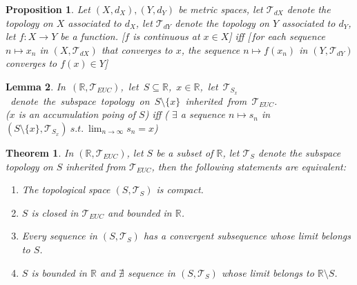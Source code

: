 \documentclass[11pt]{article}
\theoremstyle{break}
\theoremstyle{break}
\newtheorem{thm}{Theorem}[section]
\newtheorem{lem}{Lemma}[thm]
\newtheorem{prop}[lem]{Proposition}
\newcommand{\R}{\mathbb{R}}
\newcommand{\T}{\mathcal{T}}
\begin{document}
	\begin{prop}
		Let $(X,d_X),(Y,d_Y)$ be metric spaces, let $\T_{dX}$ denote the topology on $X$ associated to $d_X$, let $\T_{dY}$ denote the topology on $Y$ associated to $d_Y$, let $f:X \to Y$ be a function. [$f$ is continuous at $x \in X$] iff [\,for each sequence $n \mapsto x_n$ in $(X,\T_{dX})$ that converges to $x$, the sequence $n \mapsto f(x_n)$ in $(Y,\T_{dY})$ converges to $f(x) \in Y$]
	\end{prop}
	
	\begin{lem}
		\mbox{In $(\R, \T_{EUC})$, let $S \subseteq \R$, $x \in \R$, let $\T_{S_x}$ denote the subspace topology on $S \setminus \{x \} $ inherited from $\T_{EUC}$.}\\($x$ is an accumulation poing of $S$) iff ( $\exists$ a sequence $n \mapsto s_n$ in $(S\setminus \{x \},\T_{S_x}) \ s.t. \ \lim_{n \to \infty} s_n = x$)
	\end{lem} 
	
	
	\begin{thm}
		In $(\R, \T_{EUC})$, let $S$ be a subset of $\R$, let $\T_S$ denote the subspace topology on $S$ inherited from $\T_{EUC}$, then the following statements are equivalent:
		\begin{enumerate}[topsep=3pt,itemsep=-1ex,partopsep=1ex,parsep=1ex]
			\item The topological space $(S,\T_S)$ is compact.
			\item $S$ is closed in $\T_{EUC}$ and bounded in $\R$.
			\item Every sequence in $(S,\T_S)$ has a convergent subsequence whose limit belongs to $S$.
			\item $S$ is bounded in $\R$ and $\nexists$ sequence in $(S,\T_S)$ whose limit belongs to $\R \setminus S$.
		\end{enumerate}
	\end{thm}
	
\end{document}
